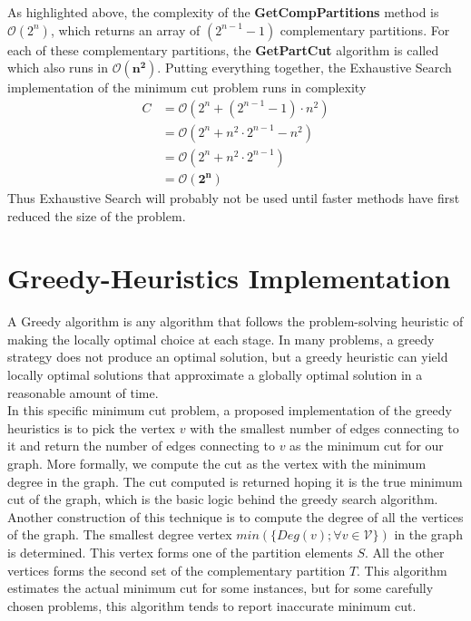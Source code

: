 \documentclass[longpaper, english, final, times]{revdetua}
\begin{document}
			As highlighted above, the complexity of the \textbf{GetCompPartitions} method is $\mathcal{O}(2^n)$, which returns an array of $(2^{n-1}-1)$ complementary partitions. For each of these complementary partitions, the \textbf{GetPartCut} algorithm is called which also runs in $\mathbf{\mathcal{O}(n^2)}$. Putting everything together, the Exhaustive Search implementation of the minimum cut problem runs in complexity
			\begin{align*}
				C & = \mathcal{O}\left(2^n + (2^{n-1}-1)\cdot n^2\right) \\
				& = \mathcal{O}\left(2^n + n^2\cdot 2^{n-1} - n^2\right) \\
				& = \mathcal{O}\left(2^n + n^2\cdot 2^{n-1}\right) \\
				& = \mathbf{\mathcal{O}\left(2^n\right)}
			\end{align*}
			Thus Exhaustive Search will probably not be used until faster methods have first reduced the size of the problem.
		
	\section{Greedy-Heuristics Implementation}
		A Greedy algorithm is any algorithm that follows the problem-solving heuristic of making the locally optimal choice at each stage.\cite{black2012greedy} In many problems, a greedy strategy does not produce an optimal solution, but a greedy heuristic can yield locally optimal solutions that approximate a globally optimal solution in a reasonable amount of time.\\
		
		In this specific minimum cut problem, a proposed implementation of the greedy heuristics is to pick the vertex $v$ with the smallest number of edges connecting to it and return the number of edges connecting to $v$ as the minimum cut for our graph. More formally, we compute the cut as the vertex with the minimum degree in the graph. The cut computed is returned hoping it is the true minimum cut of the graph, which is the basic logic behind the greedy search algorithm. Another construction of this technique is to compute the degree of all the vertices of the graph. The smallest degree vertex $min(\{Deg(v); \forall v \in \mathcal{V}\})$ in the graph is determined. This vertex forms one of the partition elements $S$. All the other vertices forms the second set of the complementary partition $T$. This algorithm estimates the actual minimum cut for some instances, but for some carefully chosen problems, this algorithm tends to report inaccurate minimum cut.\\
		
\end{document}
